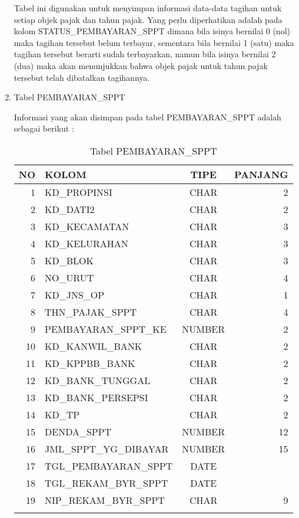 \begin{enumerate}[1.]
  Tabel ini digunakan untuk menyimpan informasi data-data tagihan untuk setiap objek pajak dan tahun pajak. Yang perlu diperhatikan adalah pada kolom STATUS\_PEMBAYARAN\_SPPT dimana bila isinya bernilai 0 (nol) maka tagihan tersebut belum terbayar, sementara bila bernilai 1 (satu) maka tagihan tersebut berarti sudah terbayarkan, namun bila isinya bernilai 2 (dua) maka akan menunjukkan bahwa objek pajak untuk tahun pajak tersebut telah dibatalkan tagihannya.
  
  \item Tabel PEMBAYARAN\_SPPT
  
  Informasi yang akan disimpan pada tabel PEMBAYARAN\_SPPT adalah sebagai berikut :
  
  \begin{longtable}{|r|l|c|r|}
    \hline
    \textbf{NO} & \textbf{KOLOM} & \textbf{TIPE} & \textbf{PANJANG} \\
    \hline \hline
    1 & KD\_PROPINSI & CHAR & 2 \\
    \hline
    2 & KD\_DATI2 & CHAR & 2 \\
    \hline
    3 & KD\_KECAMATAN & CHAR & 3 \\
    \hline
    4 & KD\_KELURAHAN & CHAR & 3 \\
    \hline
    5 & KD\_BLOK & CHAR & 3 \\
    \hline
    6 & NO\_URUT & CHAR & 4 \\ 
    \hline
    7 & KD\_JNS\_OP & CHAR & 1 \\
    \hline
    8 & THN\_PAJAK\_SPPT & CHAR & 4 \\
    \hline
    9 & PEMBAYARAN\_SPPT\_KE & NUMBER & 2 \\
    \hline
    10 & KD\_KANWIL\_BANK & CHAR & 2 \\
    \hline
    11 & KD\_KPPBB\_BANK & CHAR & 2 \\
    \hline
    12 & KD\_BANK\_TUNGGAL & CHAR & 2 \\
    \hline 
    13 & KD\_BANK\_PERSEPSI & CHAR & 2 \\
    \hline
    14 & KD\_TP & CHAR & 2 \\
    \hline
    15 & DENDA\_SPPT & NUMBER & 12 \\
    \hline
    16 & JML\_SPPT\_YG\_DIBAYAR & NUMBER & 15 \\
    \hline
    17 & TGL\_PEMBAYARAN\_SPPT & DATE & \\
    \hline
    18 & TGL\_REKAM\_BYR\_SPPT & DATE & \\
    \hline
    19 & NIP\_REKAM\_BYR\_SPPT & CHAR & 9 \\
    \hline
    \caption{Tabel PEMBAYARAN\_SPPT}
  \end{longtable}
  

\end{enumerate}
